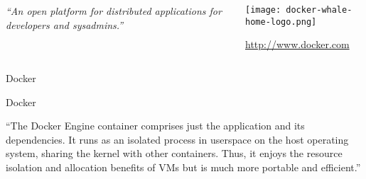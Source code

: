 \documentclass[presentation]{beamer}
\begin{document}
{
\begin{frame}[label=sec-7-1]{}

\begin{columns}
\begin{column}{0.5\textwidth}

\textit{``An open platform for distributed applications for developers and sysadmins.''}
\end{column}

\begin{column}{0.5\textwidth}
\texttt{[image: docker-whale-home-logo.png]}

\url{http://www.docker.com}
\end{column}
\end{columns}
\end{frame}
} %

{
\begin{frame}[label=sec-7-2]{Docker}

\begin{block}{Docker}

``The Docker Engine container comprises just the application and its dependencies. It runs as an isolated process in userspace on the host operating system, sharing the kernel with other containers. Thus, it enjoys the resource isolation and allocation benefits of VMs but is much more portable and efficient.''
\end{block}
\end{frame}
} %
\end{document}
